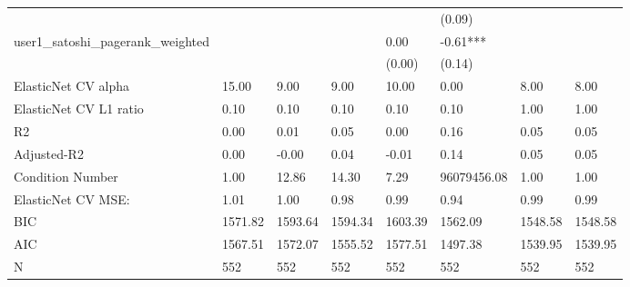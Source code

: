 \begin{table}
\begin{center}
\begin{tabular}{llllllll}
                                               &         &         &         &         & (0.09)      &           &          \\
user1_satoshi_pagerank_weighted                &         &         &         & 0.00    & -0.61***    &           &          \\
                                               &         &         &         & (0.00)  & (0.14)      &           &          \\
ElasticNet CV alpha                            & 15.00   & 9.00    & 9.00    & 10.00   & 0.00        & 8.00      & 8.00     \\
ElasticNet CV  L1 ratio                        & 0.10    & 0.10    & 0.10    & 0.10    & 0.10        & 1.00      & 1.00     \\
R2                                             & 0.00    & 0.01    & 0.05    & 0.00    & 0.16        & 0.05      & 0.05     \\
Adjusted-R2                                    & 0.00    & -0.00   & 0.04    & -0.01   & 0.14        & 0.05      & 0.05     \\
Condition Number                               & 1.00    & 12.86   & 14.30   & 7.29    & 96079456.08 & 1.00      & 1.00     \\
ElasticNet CV MSE:                             & 1.01    & 1.00    & 0.98    & 0.99    & 0.94        & 0.99      & 0.99     \\
BIC                                            & 1571.82 & 1593.64 & 1594.34 & 1603.39 & 1562.09     & 1548.58   & 1548.58  \\
AIC                                            & 1567.51 & 1572.07 & 1555.52 & 1577.51 & 1497.38     & 1539.95   & 1539.95  \\
N                                              & 552     & 552     & 552     & 552     & 552         & 552       & 552      \\
\hline
\end{tabular}
\end{center}
\end{table}